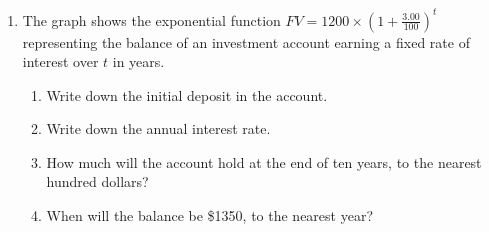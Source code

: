 \documentclass[12pt, twoside]{article}
\begin{document}
\begin{enumerate}
\newpage
\item The graph shows the exponential function $\displaystyle FV=1200 \times \left( 1+\frac{3.00}{100} \right)^t$ representing the balance of an investment account earning a fixed rate of interest over $t$ in years.
\begin{multicols}{2}
    \begin{enumerate}[itemsep=1cm]
        \item Write down the initial deposit in the account.
        \item Write down the annual interest rate.
        \item How much will the account hold at the end of ten years, to the nearest hundred dollars?
        \item When will the balance be \$1350, to the nearest year?
    \end{enumerate}
    \begin{center}
    \end{center}
    \end{multicols} \vspace{1cm}


\end{enumerate}
\end{document}
